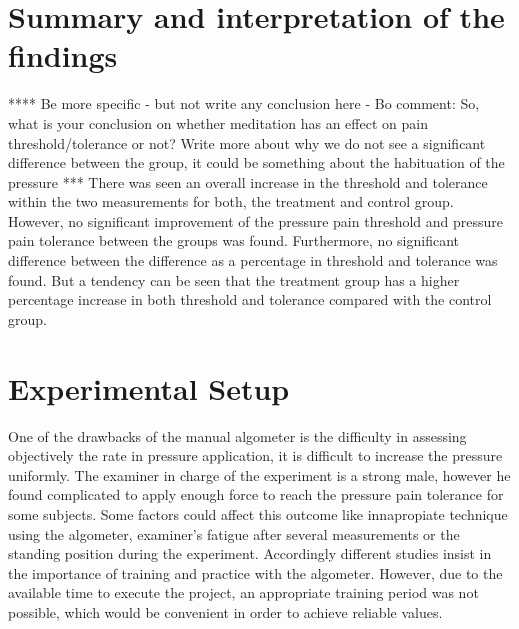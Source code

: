 \section{Summary and interpretation of the findings}
**** Be more specific - but not write any conclusion here - Bo comment: So, what is your conclusion on whether meditation has an effect on pain threshold/tolerance or not? Write more about why we do not see a significant difference between the group, it could be something about the habituation of the pressure  ***
There was seen an overall increase in the threshold and tolerance within the two measurements for both, the treatment and control group. However, no significant improvement of the pressure pain threshold and pressure pain tolerance between the groups was found. Furthermore, no significant difference between the difference as a percentage in threshold and tolerance was found. But a tendency can be seen that the treatment group has a higher percentage increase in both threshold and tolerance compared with the control group. 


\section{Experimental Setup}
One of the drawbacks of the manual algometer is the difficulty in assessing objectively the rate in pressure application, it is difficult to increase the pressure uniformly. The examiner in charge of the experiment is a strong male, however he found complicated to apply enough force to reach the pressure pain tolerance for some subjects. Some factors could affect this outcome like innapropiate technique using the algometer, examiner's fatigue after several measurements or the standing position during the experiment. Accordingly different studies insist in the importance of training and practice with the algometer. However, due to the available time to execute the project, an appropriate training period was not possible, which would be convenient in order to achieve reliable values.

